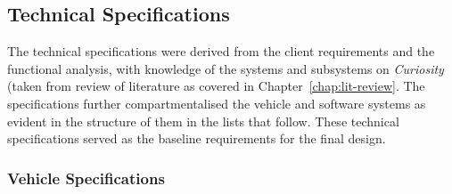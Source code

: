   \subsection{Technical Specifications}
  \label{sec:probDef-technicalSpecs}
    The technical specifications were derived from the client requirements and the functional analysis, with knowledge of the systems and subsystems on \textit{Curiosity} (taken from review of literature as covered in Chapter~\ref{chap:lit-review}. The specifications further compartmentalised the vehicle and software systems as evident in the structure of them in the lists that follow. These technical specifications served as the baseline requirements for the final design.
    
    \subsubsection{Vehicle Specifications}
    \label{subsec:probDef-vehicleSpecifications}

